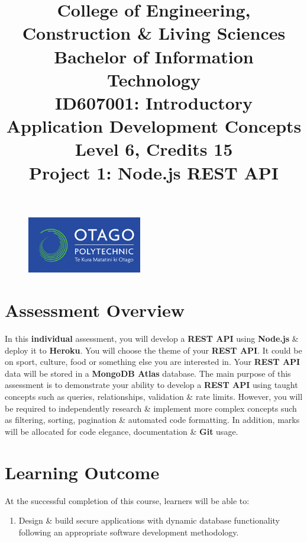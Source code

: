 \documentclass{article}
\author{}
\begin{document}
\begin{figure}
	\centering
	\includegraphics[width=50mm]{../img/logo.png}
\end{figure}

\title{College of Engineering, Construction \& Living Sciences\\Bachelor of Information Technology\\ID607001: Introductory Application Development Concepts\\Level 6, Credits 15\\\textbf{Project 1: Node.js REST API}}
\date{}
\maketitle

\section*{Assessment Overview}
In this \textbf{individual} assessment, you will develop a \textbf{REST API} using \textbf{Node.js} \& deploy it to \textbf{Heroku}. You will choose the theme of your \textbf{REST API}. It could be on sport, culture, food or something else you are interested in. Your \textbf{REST API} data will be stored in a \textbf{MongoDB Atlas} database. The main purpose of this assessment is to demonstrate your ability to develop a \textbf{REST API} using taught concepts such as queries, relationships, validation \& rate limits. However, you will be required to independently research \& implement more complex concepts such as filtering, sorting, pagination \& automated code formatting. In addition, marks will be allocated for code elegance, documentation \& \textbf{Git} usage.

\section*{Learning Outcome}
At the successful completion of this course, learners will be able to:
\begin{enumerate}
	\item Design \& build secure applications with dynamic database functionality following an appropriate software development methodology.
\end{enumerate}
\end{document}
